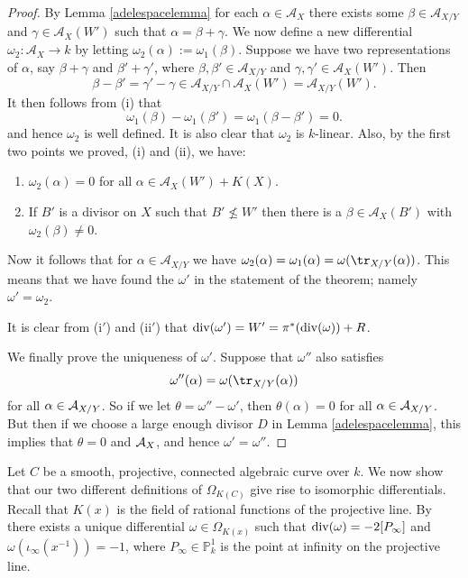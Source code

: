 \begin{proof}
    By Lemma \ref{adelespacelemma} for each $\alpha \in \mathcal{A}_X$ there exists some $\beta \in \mathcal{A}_{X/Y}$ and $\gamma \in \mathcal{A}_X(W')$ such that $\alpha = \beta + \gamma$.
    We now define a new differential $\omega_2 \colon  \mathcal{A}_X \rightarrow k$ by letting $\omega_2(\alpha) := \omega_1(\beta)$.
    Suppose we have two representations of $\alpha$, say $\beta+ \gamma$ and $\beta' + \gamma'$, where $\beta, \beta' \in \mathcal{A}_{X/Y}$ and $\gamma, \gamma' \in \mathcal{A}_{X}(W')$.
    Then 
        \[
        \beta - \beta' = \gamma' - \gamma \in \mathcal{A}_{X/Y} \cap \mathcal{A}_X(W') = \mathcal{A}_{X/Y}(W').
        \]
    It then follows from (i) that 
        \[
        \omega_1(\beta) - \omega_1(\beta') = \omega_1(\beta - \beta') = 0.
        \]
    and hence $\omega_2$ is well defined.
    It is also clear that $\omega_2$ is $k$-linear.
    Also, by the first two points we proved, (i) and (ii), we have:
        \begin{enumerate}[(i$'$)]
        \item $\omega_2(\alpha) = 0$ for all $\alpha \in \mathcal{A}_X(W') + K(X)$.
        \item If $B'$ is a divisor on $X$ such that $B'\nleq W'$ then there is a $\beta \in \mathcal{A}_X(B')$ with $\omega_2(\beta) \neq 0$.
        \end{enumerate}
    
    
    Now it follows that for $\alpha \in \mathcal{A}_{X/Y}$ we have $\omega_2(\alpha) = \omega_1(\alpha) = \omega(\tr_{X/Y}(\alpha))$.
    This means that we have found the $\omega'$ in the statement of the theorem; namely $\omega' = \omega_2$.
    
    It is clear from (i$'$) and (ii$'$) that $\operatorname{div}(\omega') = W' = \pi^*(\operatorname{div}(\omega)) + R$.
    
    We finally prove the uniqueness of $\omega'$.
    Suppose that $\omega''$ also satisfies 
        \[
        \omega''(\alpha) = \omega(\tr_{X/Y}(\alpha))
        \]
    for all $\alpha\in {\mathcal A}_{X/Y}$.
    So if we let $\theta = \omega'' - \omega'$, then $\theta(\alpha) = 0$ for all $\alpha \in {\mathcal A}_{X/Y}$.
    But then if we choose a large enough divisor $D$ in Lemma \ref{adelespacelemma}, this implies that $\theta = 0$ and ${\mathcal A}_X$, and hence $\omega' = \omega''$.
    \end{proof}





Let $C$ be a smooth, projective, connected algebraic curve over $k$.
We now show that our two different definitions of $\Omega_{K(C)}$ give rise to isomorphic differentials.
Recall that $K(x)$ is the field of rational functions of the projective line.
By \cite[Prop. 1.7.4]{stichtenoth} there exists a unique differential $\omega \in \Omega_{K(x)}$ such that $\operatorname{div} (\omega) = -2[P_{\infty}]$ and $\omega(\iota_\infty(x^{-1})) = -1$, where $P_\infty \in \mathbb P_k^1$ is the point at infinity on the projective line.


